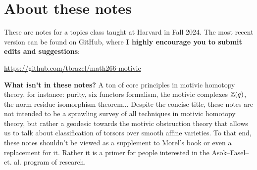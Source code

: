 \documentclass[11pt,openany]{book}
\begin{document}
\dominitoc

\maketitle

\setcounter{tocdepth}{1}

\setcounter{minitocdepth}{1}


\tableofcontents{}
 

\setlength{\parskip}{0.2em}

\setcounter{section}{-1}

\section*{About these notes}

These are notes for a topics class taught at Harvard in Fall 2024. The most recent version can be found on GitHub, where \textbf{I highly encourage you to submit edits and suggestions}:
\begin{center}
    \href{https://github.com/tbrazel/math266-motivic}{https://github.com/tbrazel/math266-motivic}
\end{center}

\textbf{What isn't in these notes?} A ton of core principles in motivic homotopy theory, for instance: purity, six functors formalism, the motivic complexes $\mathbb{Z}(q)$, the norm residue isomorphism theorem... Despite the concise title, these notes are not intended to be a sprawling survey of all techniques in motivic homotopy theory, but rather a geodesic towards the motivic obstruction theory that allows us to talk about classification of torsors over smooth affine varieties. To that end, these notes shouldn't be viewed as a supplement to Morel's book or even a replacement for it. Rather it is a primer for people interested in the Asok--Fasel--et. al. program of research.
\end{document}
